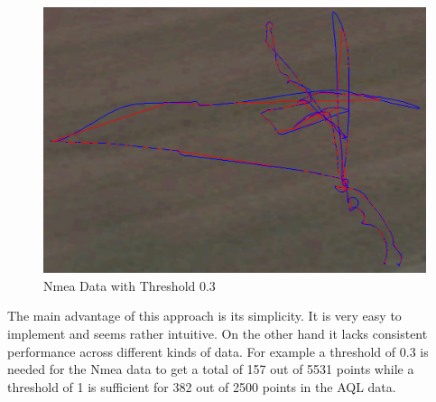 \documentclass[paper=letter, fontsize=10pt]{article}
\begin{document}
\begin{figure}
\centering
\includegraphics[width=.5\textwidth]{Figures/Nmea_threshold_0_3_w_alt}
\caption{Nmea Data with Threshold 0.3}
\label{fig:Nmea.3}
\end{figure}


The main advantage of this approach is its simplicity. It is very easy to implement and seems rather intuitive. On the other hand it lacks consistent performance across different kinds of data. For example a threshold of 0.3 is needed for the Nmea data to get a total of 157 out of 5531 points while a threshold of 1 is sufficient for 382 out of 2500 points in the AQL data.
%
%
\end{document}
